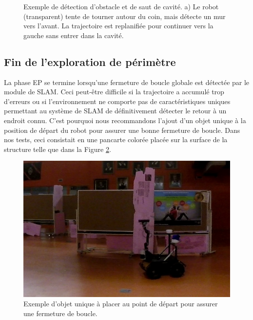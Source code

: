 \begin{figure}[ht]
\centering
{}
\hfil
{}
\caption{
Exemple de détection d'obstacle et de saut de cavité. a) Le robot (transparent) tente de tourner autour du coin, mais détecte un mur vers l'avant. La trajectoire est replanifiée pour continuer vers la gauche sans entrer dans la cavité.}
\label{fig:ugv_exploration}
\end{figure}

\subsection{Fin de l'exploration de périmètre}

La phase EP se termine lorsqu'une fermeture de boucle globale est détectée par le module de SLAM. Ceci peut-être difficile si la trajectoire a accumulé trop d'erreurs ou si l'environnement ne comporte pas de caractéristiques uniques permettant au système de SLAM de définitivement détecter le retour à un endroit connu. C'est pourquoi nous recommandons l'ajout d'un objet unique à la position de départ du robot pour assurer une bonne fermeture de boucle. Dans nos tests, ceci consistait en une pancarte colorée placée sur la surface de la structure telle que dans la Figure \ref{fig:ugv_pancarte}.

\begin{figure}[ht]
  \centering
  \includegraphics[width=0.5\linewidth]{images/ugv_unique.jpg}
  \caption{Exemple d'objet unique à placer au point de départ pour assurer une fermeture de boucle.}
  \label{fig:ugv_pancarte}
\end{figure}

